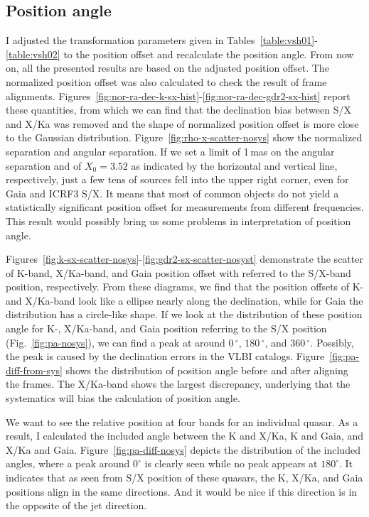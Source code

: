 \documentclass{aa}   %
\begin{document}
\subsection{Position angle}    \label{subsec:pa}
I adjusted the transformation parameters given in Tables~\ref{table:vsh01}-\ref{table:vsh02} to the position offset and recalculate the position angle. 
From now on, all the presented results are based on the adjusted position offset.
The normalized position offset was also calculated to check the result of frame alignments.
Figures~\ref{fig:nor-ra-dec-k-sx-hist}-\ref{fig:nor-ra-dec-gdr2-sx-hist} report these quantities, from which we can find that the declination bias between S/X and X/Ka was removed and the shape of normalized position offset is more close to the Gaussian distribution.
Figure~\ref{fig:rho-x-scatter-nosys} show the normalized separation and angular separation.
If we set a limit of 1\,mas on the angular separation and of $X_0=3.52$ as indicated by the horizontal and vertical line, respectively, just a few tens of sources fell into the upper right corner, even for Gaia and ICRF3 S/X.
It means that most of common objects do not yield a statistically significant position offset for measurements from different frequencies.
This result would possibly bring us some problems in interpretation of position angle.

Figures~\ref{fig:k-sx-scatter-nosys}-\ref{fig:gdr2-sx-scatter-nosyst} demonstrate the scatter of K-band, X/Ka-band, and Gaia position offset with referred to the S/X-band position, respectively.
From these diagrams, we find that the position offsets of K- and X/Ka-band look like a ellipse nearly along the declination, while for Gaia the distribution has a circle-like shape.
If we look at the distribution of these position angle for K-, X/Ka-band, and Gaia position referring to the S/X position (Fig.~\ref{fig:pa-nosys}), we can find a peak at around $0\,^\circ$, $180\,^\circ$, and $360\,^\circ$.
Possibly, the peak is caused by the declination errors in the VLBI catalogs.
Figure~\ref{fig:pa-diff-from-sys} shows the distribution of position angle before and after aligning the frames.
The X/Ka-band shows the largest discrepancy, underlying that the systematics will bias the calculation of position angle.

We want to see the relative position at four bands for an individual quasar.
As a result, I calculated the included angle between the K and X/Ka, K and Gaia, and X/Ka and Gaia.
Figure~\ref{fig:pa-diff-nosys} depicts the distribution of the included angles, where a peak around $0^\circ$ is clearly seen while no peak appears at $180^\circ$.
It indicates that as seen from S/X position of these quasars, the K, X/Ka, and Gaia positions align in the same directions.
And it would be nice if this direction is in the opposite of the jet direction.
  
\end{document}
